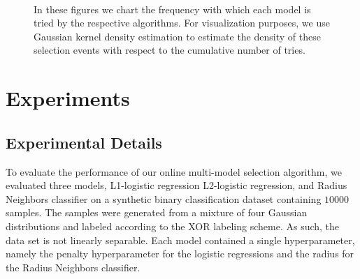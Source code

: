 \documentclass{article}
\begin{document}
\begin{figure}
  \vspace{0pt}
  \centering
  ~
  
  \caption{In these figures we chart the frequency with which each model is tried by the respective algorithms. For visualization purposes, we use Gaussian kernel density estimation to estimate the density of these selection events with respect to the cumulative number of tries.}
\end{figure}

\section{Experiments}
\subsection{Experimental Details}
\label{exp}
To evaluate the performance of our online multi-model selection algorithm, we evaluated three models, L1-logistic regression L2-logistic regression, and Radius Neighbors classifier on a synthetic binary classification dataset containing $10000$ samples. The samples were generated from a mixture of four Gaussian distributions and labeled according to the XOR labeling scheme. As such, the data set is not linearly separable. Each model contained a single hyperparameter, namely the penalty hyperparameter for the logistic regressions and the radius for the Radius Neighbors classifier.
\end{document}
